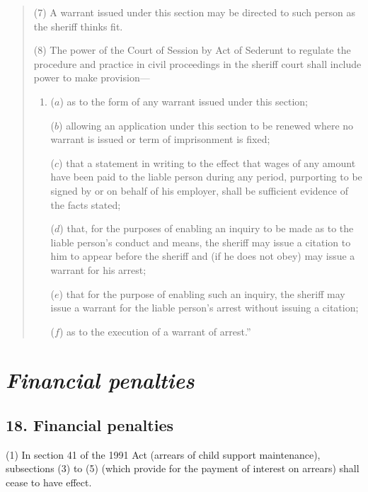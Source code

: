 \documentclass[12pt,a4paper]{article}
\begin{document}
\begin{quotation}
(7) A warrant issued under this section may be directed to such person as the sheriff thinks fit.

(8) The power of the Court of Session by Act of Sederunt to regulate the procedure and practice in civil proceedings in the sheriff court shall include power to make provision—
\begin{enumerate}\item[]
($a$) as to the form of any warrant issued under this section;

($b$) allowing an application under this section to be renewed where no warrant is issued or term of imprisonment is fixed;

($c$) that a statement in writing to the effect that wages of any amount have been paid to the liable person during any period, purporting to be signed by or on behalf of his employer, shall be sufficient evidence of the facts stated;

($d$) that, for the purposes of enabling an inquiry to be made as to the liable person’s conduct and means, the sheriff may issue a citation to him to appear before the sheriff and (if he does not obey) may issue a warrant for his arrest;

($e$) that for the purpose of enabling such an inquiry, the sheriff may issue a warrant for the liable person’s arrest without issuing a citation;

($f$) as to the execution of a warrant of arrest.”
\end{enumerate}
\end{quotation}

\section{\itshape Financial penalties}

\subsection{18. Financial penalties}

(1) In section 41 of the 1991 Act (arrears of child support maintenance), subsections (3)  to (5)  (which provide for the payment of interest on arrears) shall cease to have effect.
\end{document}
